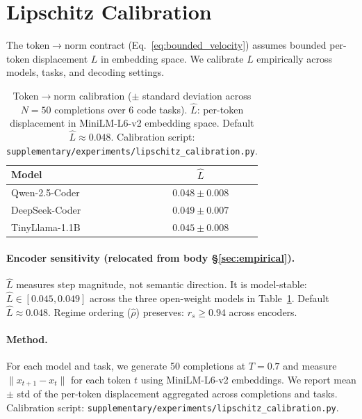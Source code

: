 \documentclass{article}
\theoremstyle{plain}
\theoremstyle{definition}
\theoremstyle{remark}
\newcommand{\rhohat}{\hat{\rho}}
\begin{document}
\section{Lipschitz Calibration}\label{app:lipschitz_calibration}\hypertarget{lim:linear}{}

The token$\to$norm contract (Eq.~\ref{eq:bounded_velocity}) assumes bounded per-token displacement $L$ in embedding space. We calibrate $L$ empirically across models, tasks, and decoding settings.

\begin{table}[ht]
\centering
\small
\caption{Token$\to$norm calibration ($\pm$ standard deviation across $N{=}50$ completions over 6 code tasks). $\hat{L}$: per-token displacement in MiniLM-L6-v2 embedding space. Default $\hat{L} \approx 0.048$. Calibration script: \texttt{supplementary/experiments/lipschitz\_calibration.py}.}
\label{tab:lipschitz_calibration}
\begin{tabular}{lc}
\toprule
Model & $\hat{L}$ \\
\midrule
Qwen-2.5-Coder & $0.048 \pm 0.008$ \\
DeepSeek-Coder & $0.049 \pm 0.007$ \\
TinyLlama-1.1B & $0.045 \pm 0.008$ \\
\bottomrule
\end{tabular}
\end{table}

\paragraph{Encoder sensitivity (relocated from body \S\ref{sec:empirical}).}
$\hat{L}$ measures step magnitude, not semantic direction. It is model-stable: $\hat{L} \in [0.045, 0.049]$ across the three open-weight models in Table~\ref{tab:lipschitz_calibration}. Default $\hat{L} \approx 0.048$. Regime ordering ($\rhohat$) preserves: $r_s \ge 0.94$ across encoders.

\paragraph{Method.}
For each model and task, we generate 50 completions at $T{=}0.7$ and measure $\|x_{t+1} - x_t\|$ for each token $t$ using MiniLM-L6-v2 embeddings. We report mean $\pm$ std of the per-token displacement aggregated across completions and tasks. Calibration script: \texttt{supplementary/experiments/lipschitz\_calibration.py}.
\end{document}
